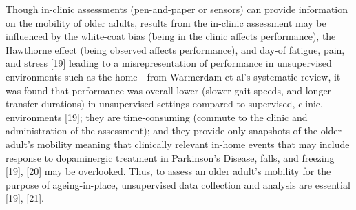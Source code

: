 Though in-clinic assessments (pen-and-paper or sensors) can provide information on the mobility of 
older adults, results from the in-clinic assessment may be influenced by the white-coat bias 
(being in the clinic affects performance), the Hawthorne effect (being observed affects performance), 
and day-of fatigue, pain, and stress [19] leading to a misrepresentation of performance in unsupervised 
environments such as the home—from Warmerdam et al’s systematic review, it was found that performance 
was overall lower (slower gait speeds, and longer transfer durations) in unsupervised settings compared 
to supervised, clinic, environments [19]; they are time-consuming (commute to the clinic and 
administration of the assessment); and they provide only snapshots of the older adult's mobility 
meaning that clinically relevant in-home events that may include response to dopaminergic treatment 
in Parkinson’s Disease, falls, and freezing [19], [20] may be overlooked. Thus, to assess an older 
adult’s mobility for the purpose of ageing-in-place, unsupervised data collection and analysis are 
essential [19], [21].

